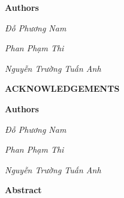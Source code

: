 \documentclass[12pt,a4paper]{report}
\theoremstyle{definition}
\begin{document}
\par\hfill\textbf{Authors}\hspace{1cm}
\par\hfill\textit{Đỗ Phương Nam}
\par\hfill\textit{Phan Phạm Thi}\hspace{0.3cm}
\par\hfill\textit{Nguyễn Trường Tuấn Anh}\hspace{0.2cm}
\newpage

\begin{center}
    \textbf{\Large ACKNOWLEDGEMENTS}
\end{center}

\par\hfill\textbf{Authors}\hspace{1cm}
\par\hfill\textit{Đỗ Phương Nam}
\par\hfill\textit{Phan Phạm Thi}\hspace{0.3cm}
\par\hfill\textit{Nguyễn Trường Tuấn Anh}\hspace{0.2cm}
\newpage

\begin{center}
    \textbf{\Large Abstract}
\end{center}
\newpage

\begin{singlespace}
\tableofcontents
\end{singlespace}
\newpage

\begin{singlespace}
\listoffigures
\end{singlespace}
\newpage

\begin{singlespace}
\listoftables
\end{singlespace}
\newpage



\newpage

\newpage


\newpage


\newpage








% 

\printbibliography
\end{document}
